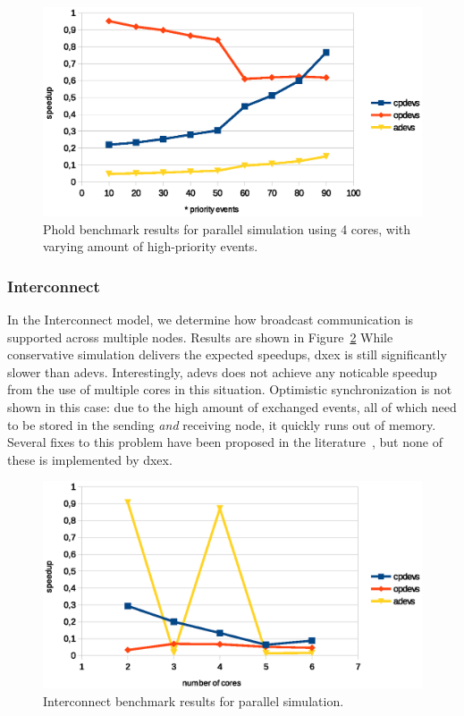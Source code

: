 \begin{figure}
    \includegraphics[width=\columnwidth]{fig/phold_voorlopig.eps}
    \caption{Phold benchmark results for parallel simulation using 4 cores, with varying amount of high-priority events.}
    \label{fig:phold_priority}
\end{figure}

\subsubsection{Interconnect}
In the Interconnect model, we determine how broadcast communication is supported across multiple nodes.
Results are shown in Figure~\ref{fig:interconnect_benchmark_parallel}
While conservative simulation delivers the expected speedups, dxex is still significantly slower than adevs.
Interestingly, adevs does not achieve any noticable speedup from the use of multiple cores in this situation.
Optimistic synchronization is not shown in this case: due to the high amount of exchanged events, all of which need to be stored in the sending \textit{and} receiving node, it quickly runs out of memory.
Several fixes to this problem have been proposed in the literature~\cite{FujimotoBook}, but none of these is implemented by dxex.

\begin{figure}
    \includegraphics[width=\columnwidth]{fig/interconnect_parallel.eps}
    \caption{Interconnect benchmark results for parallel simulation.}
    \label{fig:interconnect_benchmark_parallel}
\end{figure}

